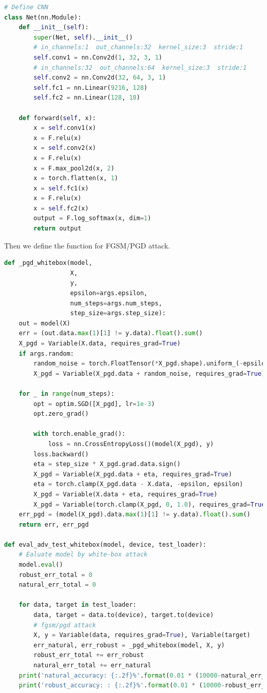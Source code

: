 \begin{lstlisting}[language=Python]
# Define CNN
class Net(nn.Module):
    def __init__(self):
        super(Net, self).__init__()
        # in_channels:1  out_channels:32  kernel_size:3  stride:1
        self.conv1 = nn.Conv2d(1, 32, 3, 1)
        # in_channels:32  out_channels:64  kernel_size:3  stride:1
        self.conv2 = nn.Conv2d(32, 64, 3, 1)
        self.fc1 = nn.Linear(9216, 128)
        self.fc2 = nn.Linear(128, 10)

    def forward(self, x):
        x = self.conv1(x)
        x = F.relu(x)
        x = self.conv2(x)
        x = F.relu(x)
        x = F.max_pool2d(x, 2)
        x = torch.flatten(x, 1)
        x = self.fc1(x)
        x = F.relu(x)
        x = self.fc2(x)
        output = F.log_softmax(x, dim=1)
        return output
\end{lstlisting}


Then we define the function for FGSM/PGD attack.
\begin{lstlisting}[language=Python]
def _pgd_whitebox(model,
                  X,
                  y,
                  epsilon=args.epsilon,
                  num_steps=args.num_steps,
                  step_size=args.step_size):
    out = model(X)
    err = (out.data.max(1)[1] != y.data).float().sum()
    X_pgd = Variable(X.data, requires_grad=True)
    if args.random:
        random_noise = torch.FloatTensor(*X_pgd.shape).uniform_(-epsilon, epsilon).to(device)
        X_pgd = Variable(X_pgd.data + random_noise, requires_grad=True)

    for _ in range(num_steps):
        opt = optim.SGD([X_pgd], lr=1e-3)
        opt.zero_grad()

        with torch.enable_grad():
            loss = nn.CrossEntropyLoss()(model(X_pgd), y)
        loss.backward()
        eta = step_size * X_pgd.grad.data.sign()
        X_pgd = Variable(X_pgd.data + eta, requires_grad=True)
        eta = torch.clamp(X_pgd.data - X.data, -epsilon, epsilon)
        X_pgd = Variable(X.data + eta, requires_grad=True)
        X_pgd = Variable(torch.clamp(X_pgd, 0, 1.0), requires_grad=True)
    err_pgd = (model(X_pgd).data.max(1)[1] != y.data).float().sum()
    return err, err_pgd

def eval_adv_test_whitebox(model, device, test_loader):
    # Ealuate model by white-box attack
    model.eval()
    robust_err_total = 0
    natural_err_total = 0

    for data, target in test_loader:
        data, target = data.to(device), target.to(device)
        # fgsm/pgd attack
        X, y = Variable(data, requires_grad=True), Variable(target)
        err_natural, err_robust = _pgd_whitebox(model, X, y)
        robust_err_total += err_robust
        natural_err_total += err_natural
    print('natural_accuracy: {:.2f}%'.format(0.01 * (10000-natural_err_total)))
    print('robust_accuracy: : {:.2f}%'.format(0.01 * (10000-robust_err_total)))
\end{lstlisting}



